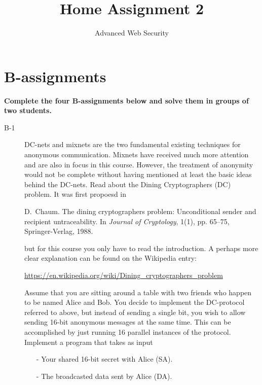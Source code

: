 \documentclass{article}
\begin{document}
\title{Home Assignment 2}
\author{Advanced Web Security}
\date{\the\year}

\maketitle

\section*{B-assignments}
\textbf{Complete the four B-assignments below and solve them in groups of two students.}

\begin{description}
	\item[B-1]{DC-nets and mixnets are the two fundamental existing techniques for anonymous communication. Mixnets have received much more attention and are also in focus in this course. However, the treatment of anonymity would not be complete without having mentioned at least the basic ideas behind the DC-nets. Read about the Dining Cryptographers (DC) problem. It was first propoesd in
	\begin{center}
		\begin{minipage}{0.8\textwidth}
			D.~Chaum. The dining cryptographers problem: Unconditional sender and recipient untraceability. In \textit{Journal of Cryptology}, 1(1), pp. 65--75, Springer-Verlag, 1988.
		\end{minipage}
	\end{center}
	but for this course you only have to read the introduction. A perhaps more clear explanation can be found on the Wikipedia entry:
	\begin{center}
		\begin{minipage}{0.8\textwidth}
			\url{https://en.wikipedia.org/wiki/Dining_cryptographers_problem}
		\end{minipage}
	\end{center}
	Assume that you are sitting around a table with two friends who happen to be named Alice and Bob. You decide to implement the DC-protocol referred to above, but instead of sending a single bit, you wish to allow sending 16-bit anonymous messages at the same time. This can be accomplished by just running 16 parallel instances of the protocol. Implement a program that takes as input
	\begin{itemize}
		\item[-] Your shared 16-bit secret with Alice (SA).
		\item[-] The broadcasted data sent by Alice (DA).

\end{itemize}}
\end{description}
\end{document}
